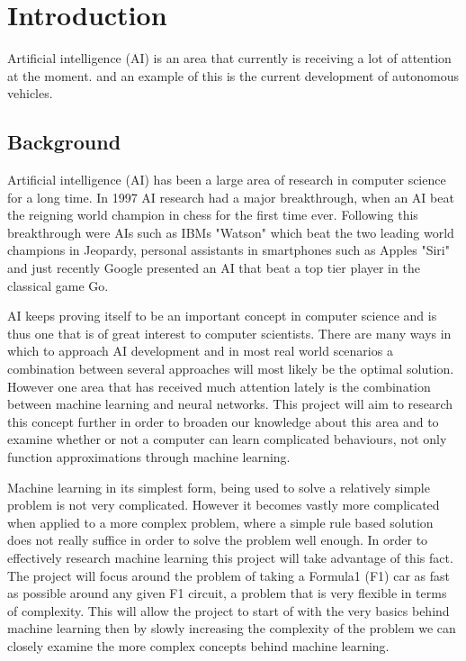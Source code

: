 \chapter{Introduction}
Artificial intelligence (AI) is an area that currently is receiving a lot of attention at the moment.  and an example of this is the current development of autonomous vehicles.    

        
\section{Background}



\iffalse
Artificial intelligence (AI) has been a large area of research in computer science for a long time. In 1997 AI research had a major breakthrough, when an AI beat the reigning world champion in chess for the first time ever. Following this breakthrough were AIs such as IBMs "Watson" which beat the two leading world champions in Jeopardy, personal assistants in smartphones such as Apples "Siri" and just recently Google presented an AI that beat a top tier player in the classical game Go.

AI keeps proving itself to be an important concept in computer science and is thus one that is of great interest to computer scientists. There are many ways in which to approach AI development and in most real world scenarios a combination between several approaches will most likely be the optimal solution. However one area that has received much attention lately is the combination between machine learning and neural networks. This project will aim to research this concept further in order to broaden our knowledge about this area and to examine whether or not a computer can learn complicated behaviours, not only function approximations through machine learning.

Machine learning in its simplest form, being used to solve a relatively simple problem is not very complicated. However it becomes vastly more complicated when applied to a more complex problem, where a simple rule based solution does not really suffice in order to solve the problem well enough. In order to effectively research machine learning this project will take advantage of this fact. The project will focus around the problem of taking a Formula1 (F1) car as fast as possible around any given F1 circuit, a problem that is very flexible in terms of complexity. This will allow the project to start of with the very basics behind machine learning then by slowly increasing the complexity of the problem we can closely examine the more complex concepts behind machine learning.

